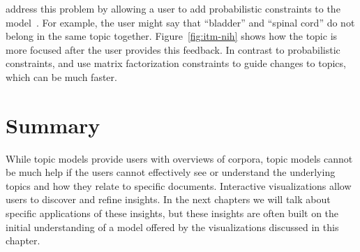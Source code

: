 \citet{hu-14:itm} address this problem by allowing a user to add probabilistic
constraints to the model~\citep{boyd-graber-07,andrzejewski-09}.  For example,
the user might say that ``bladder'' and ``spinal cord'' do not belong in the same
topic together.  Figure~\ref{fig:itm-nih} shows how the topic is more focused after the
user provides this feedback.  In contrast to probabilistic constraints,
\citet{choo-13} and \citet{lund-17} use matrix factorization constraints to guide changes
to topics, which can be much faster.

\section{Summary}

While topic models provide users with overviews of corpora, topic models
cannot be much help if the users cannot effectively see or understand
the underlying topics and how they relate to specific documents.
Interactive visualizations allow users to discover and
refine insights.  In the next chapters we will talk about specific applications of
these insights, but these insights are often built on the initial understanding
of a model offered by the visualizations discussed in this chapter.
